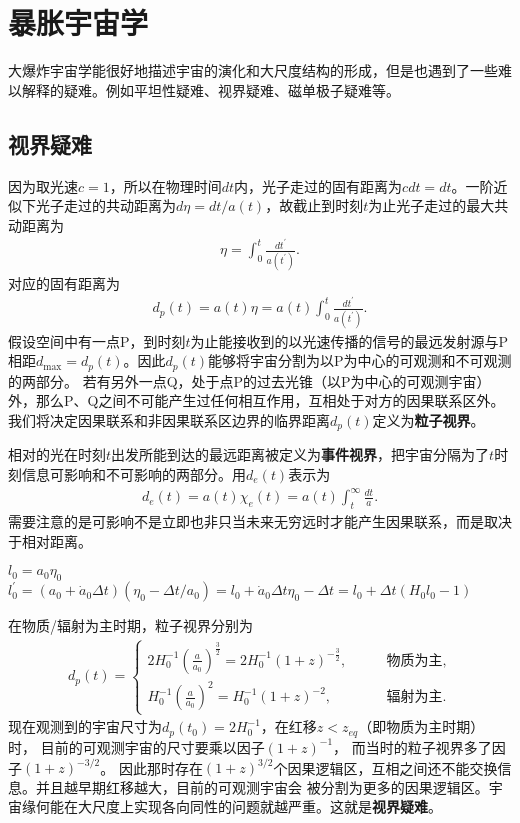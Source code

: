 \section{暴胀宇宙学}
大爆炸宇宙学能很好地描述宇宙的演化和大尺度结构的形成，但是也遇到了一些难以解释的疑难。例如平坦性疑难、视界疑难、磁单极子疑难等。

\subsection{视界疑难}
因为取光速$c=1$，所以在物理时间$dt$内，光子走过的固有距离为$cdt=dt$。一阶近似下光子走过的共动距离为$d\eta=dt
/a(t)$，故截止到时刻$t$为止光子走过的最大共动距离为
\begin{align}
  \label{eq:conformal_time}
  \eta = \int_0^{t} \frac{dt^{\prime}}{a(t^{\prime})}.
\end{align}
对应的固有距离为
\begin{align}
  \label{eq:particle_horizon}
  d_{p}(t) = a(t)\eta=a(t)\int_0^{t}\frac{dt^{\prime}}{a(t^{\prime})}.
\end{align}
假设空间中有一点P，到时刻$t$为止能接收到的以光速传播的信号的最远发射源与P相距$d_{\text{max}}=d_{p}(t)$。因此$d_{p}(t)$能够将宇宙分割为以P为中心的可观测和不可观测的两部分。
若有另外一点Q，处于点P的过去光锥（以P为中心的可观测宇宙）外，那么P、Q之间不可能产生过任何相互作用，互相处于对方的因果联系区外。我们将决定因果联系和非因果联系区边界的临界距离$d_{p}(t)$定义为\textbf{粒子视界}。

相对的光在时刻$t$出发所能到达的最远距离被定义为\textbf{事件视界}，把宇宙分隔为了$t$时刻信息可影响和不可影响的两部分。用$d_e(t)$表示为
\begin{align}
  d_e(t) = a(t)\chi_e(t) = a(t)\int_t^{\infty}\frac{dt}{a}.
\end{align}
需要注意的是可影响不是立即也非只当未来无穷远时才能产生因果联系，而是取决于相对距离。

$l_0=a_0\eta_0$\\
$l_0^{\prime}=(a_0+\dot{a}_0\Delta{t})(\eta_0-\Delta{t}/a_0)=l_0+\dot{a}_0\Delta{t}\eta_0-\Delta{t}=l_0+\Delta{t}(H_0l_0-1)$

在物质/辐射为主时期，粒子视界分别为
\begin{align}
  \label{eq:particle_horizon_matter}
  d_p(t) =
  \begin{cases}
    2H_0^{-1}{\left(\frac{a}{a_0}\right)}^{\frac{3}{2}} =
    2H_0^{-1}{\left(1+z\right)}^{-\frac{3}{2}},\qquad&\text{物质为主},\\
    H_0^{-1}{\left(\frac{a}{a_0}\right)}^2=H_0^{-1}{\left(1+z\right)}^{-2},\qquad&\text{辐射为主}.
  \end{cases}
\end{align}
现在观测到的宇宙尺寸为$d_p(t_0)=2H_0^{-1}$，在红移$z < z_{eq}$（即物质为主时期）时，
目前的可观测宇宙的尺寸要乘以因子${\left(1+z\right)}^{-1}$，
而当时的粒子视界多了因子${\left(1+z\right)}^{-3 /2}$。
因此那时存在${\left(1+z\right)}^{3/2}$个因果逻辑区，互相之间还不能交换信息。并且越早期红移越大，目前的可观测宇宙会
被分割为更多的因果逻辑区。宇宙缘何能在大尺度上实现各向同性的问题就越严重。这就是\textbf{视界疑难}。

